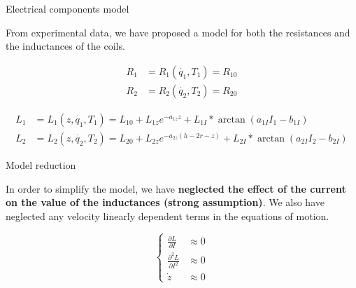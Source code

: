 \begin{frame}{Electrical components model}

    From experimental data, we have proposed a model for both the resistances and the inductances of the coils.

    \begin{equation}
        \begin{aligned}
            R_1 & = R_1(\dot{q_1}, T_1) = R_{10} \\
            R_2 & = R_2(\dot{q_2}, T_2) = R_{20}
        \end{aligned}
        \label{eq:model_for_resistance}
    \end{equation}

    \begin{equation}
        \begin{aligned}
            L_1 & = L_1(z, \dot{q_1}, T_1) = L_{10} + L_{1z} e^{-a_{1z} z} + L_{1I} * \arctan(a_{1I} I_{1} - b_{1I})            \\
            L_2 & = L_2(z, \dot{q_2}, T_2) = L_{20} + L_{2z} e^{-a_{2z} (h - 2r - z)} + L_{2I} * \arctan(a_{2I} I_{2} - b_{2I})
        \end{aligned}
        \label{eq:model_for_inductance}
    \end{equation}

\end{frame}



\begin{frame}{Model reduction}

    In order to simplify the model, we have \textbf{neglected the effect of the current on the value of the inductances (strong assumption)}.
    We also have neglected any velocity linearly dependent terms in the equations of motion.

    \begin{equation}
        \begin{cases}
            \frac{\partial L}{\partial I}     & \approx 0 \\
            \frac{\partial^2 L}{\partial I^2} & \approx 0 \\
            \dot{z}                           & \approx 0
        \end{cases}
        \label{eq:model_reduction_conditions}
    \end{equation}

\end{frame}



